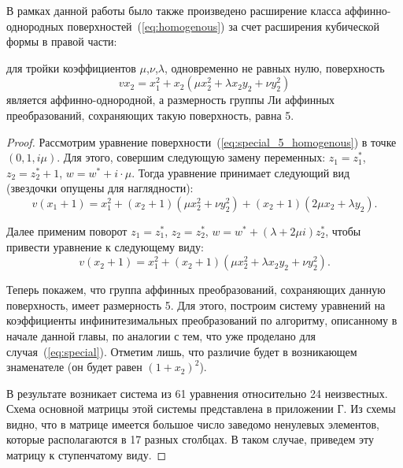\documentclass[../main.tex]{subfiles}
\begin{document}
В рамках данной работы было также произведено расширение класса аффинно-однородных поверхностей~(\ref{eq:homogenous}) за счет расширения кубической формы в правой части:
\begin{theorem}\label{special_homogenous}
для тройки коэффициентов $\mu$,$\nu$,$\lambda$, одновременно не равных нулю, поверхность
\begin{equation}\label{eq:special_5_homogenous}
v x_2 = x_1^2 + x_2 (\mu x_2 ^2 + \lambda x_2 y_2 + \nu y_2 ^2)
\end{equation}
является аффинно-однородной, а размерность группы Ли аффинных преобразований, сохраняющих такую поверхность, равна 5.
\end{theorem}
\begin{proof}

Рассмотрим уравнение поверхности~(\ref{eq:special_5_homogenous}) в точке $(0, 1, i\mu)$. Для этого, совершим следующую замену переменных: $z_1 = z^*_1$, $z_2 = z^*_2 + 1$, $w = w^* + i\cdot \mu$. Тогда уравнение принимает следующий вид (звездочки опущены для наглядности):
\begin{equation*}
v \left(x_1+1\right)=x_1^2 + \left(x_2+1\right) \left(\mu  x_2^2+\nu  y_2^2\right) + \left(x_2+1\right) \left(2 \mu  x_2+\lambda  y_2\right).
\end{equation*}

Далее применим поворот $z_1 = z^*_1$, $z_2 = z^*_2 $, $w = w^* + (\lambda + 2 \mu i) z^*_2$, чтобы привести уравнение к следующему виду:
\begin{equation*}
v (x_2 + 1) = x_1^2 + (x_2 + 1) (\mu x_2 ^2 + \lambda x_2 y_2 + \nu y_2 ^2).
\end{equation*}

Теперь покажем, что группа аффинных преобразований, сохраняющих данную поверхность, имеет размерность 5. Для этого, построим систему уравнений на коэффициенты инфинитезимальных преобразований по алгоритму, описанному в начале данной главы, по аналогии с тем, что уже проделано для случая~(\ref{eq:special}). Отметим лишь, что различие будет в возникающем знаменателе (он будет равен $(1 + x_2)^2$). 

В результате возникает система из 61 уравнения относительно 24 неизвестных. Схема основной матрицы этой системы представлена в приложении Г. Из схемы видно, что в матрице имеется большое число заведомо ненулевых элементов, которые располагаются в 17 разных столбцах. В таком случае, приведем эту матрицу к ступенчатому виду. 


\end{proof}
\end{document}
